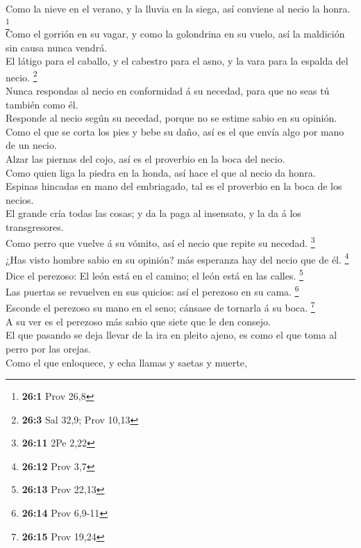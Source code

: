  Como la nieve en el verano, y la lluvia en la siega, así
conviene al necio la honra. \footnote{\textbf{26:1} Prov 26,8}\\
 Como el gorrión en su vagar, y como la golondrina en su
vuelo, así la maldición sin causa nunca vendrá.\\
 El látigo para el caballo, y el cabestro para el asno, y la
vara para la espalda del necio. \footnote{\textbf{26:3} Sal 32,9; Prov
  10,13}\\
 Nunca respondas al necio en conformidad á su necedad, para
que no seas tú también como él.\\
 Responde al necio según su necedad, porque no se estime
sabio en su opinión.\\
 Como el que se corta los pies y bebe su daño, así es el que
envía algo por mano de un necio.\\
 Alzar las piernas del cojo, así es el proverbio en la boca
del necio.\\
 Como quien liga la piedra en la honda, así hace el que al
necio da honra.\\
 Espinas hincadas en mano del embriagado, tal es el
proverbio en la boca de los necios.\\
 El grande cría todas las cosas; y da la paga al insensato,
y la da á los transgresores.\\
 Como perro que vuelve á su vómito, así el necio que repite
su necedad. \footnote{\textbf{26:11} 2Pe 2,22}\\
 ¿Has visto hombre sabio en su opinión? más esperanza hay
del necio que de él. \footnote{\textbf{26:12} Prov 3,7}\\
 Dice el perezoso: El león está en el camino; el león está
en las calles. \footnote{\textbf{26:13} Prov 22,13}\\
 Las puertas se revuelven en sus quicios: así el perezoso
en su cama. \footnote{\textbf{26:14} Prov 6,9-11}\\
 Esconde el perezoso su mano en el seno; cánsase de
tornarla á su boca. \footnote{\textbf{26:15} Prov 19,24}\\
 A su ver es el perezoso más sabio que siete que le den
consejo.\\
 El que pasando se deja llevar de la ira en pleito ajeno,
es como el que toma al perro por las orejas.\\
 Como el que enloquece, y echa llamas y saetas y muerte,\\
